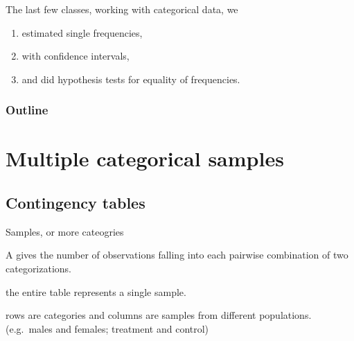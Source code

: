 %
%
%



\subtitle{$\chi^2$ between two samples}

\date{14 November 2013}






\begin{frame}
  \maketitle
\end{frame}


\begin{frame}{The last few classes,}
    working with \alert{categorical data}, we
  \begin{enumerate}
      \item estimated single frequencies,
      \item with confidence intervals,
      \item and did hypothesis tests for equality of frequencies.
  \end{enumerate}
\end{frame}

\begin{frame}\frametitle<presentation>{Outline}
  \tableofcontents
\end{frame}


\section{Multiple categorical samples}

\subsection{Contingency tables}

\begin{frame}{Samples, or more cateogries}

    A  gives the \alert{number} of observations
    falling into each pairwise \alert{combination} of two categorizations.

    \vspace{2em}

     the entire table represents a single sample.

    \vspace{2em}

     rows are \alert{categories} and columns are \alert{samples} from different populations. (e.g.\ males and females; treatment and control)

\end{frame}


